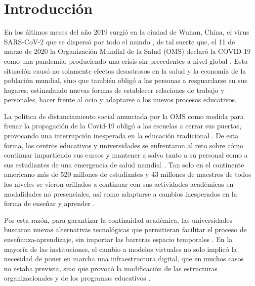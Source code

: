 \documentclass[spanish]{textolivre}
\begin{document}
\begin{polyabstract}
\begin{english}
\begin{abstract}

\end{abstract}
\end{english}

\end{polyabstract}

\section{Introducción}

En los últimos meses del año 2019 surgió en la ciudad de Wuhan, China, el virus SARS-CoV-2 que se dispersó por todo el mundo \cite{sorooshian_quarantine_2020}, de tal suerte que, el 11 de marzo de 2020 la Organización Mundial de la Salud (OMS) declaró la COVID-19 como una pandemia, produciendo una crisis sin precedentes a nivel global \cite{world_health_organization_coronavirus_2020}. Esta situación causó no solamente efectos desastrosos en la salud y la economía de la población mundial, sino que también obligó a las personas a resguardarse en sus hogares, estimulando nuevas formas de establecer relaciones de trabajo y personales, hacer frente al ocio y adaptarse a los nuevos procesos educativos.

La política de distanciamiento social anunciada por la OMS como medida para frenar la propagación de la Covid-19 obligó a las escuelas a cerrar sus puertas, provocando una interrupción inesperada en la educación tradicional \cite{adedoyin_covid-19_2020}. De esta forma, los centros educativos y universidades se enfrentaron al reto sobre cómo continuar impartiendo sus cursos y mantener a salvo tanto a su personal como a sus estudiantes de una emergencia de salud mundial \cite{tunon_navarro_confinamiento_2020}. Tan solo en el continente americano más de 520 millones de estudiantes y 43 millones de maestros de todos los niveles se vieron orillados a continuar con sus actividades académicas en modalidades no presenciales, así como adaptarse a cambios inesperados en la forma de enseñar y aprender \cite{iesalc-unesco_coronavirus_2020}.

Por esta razón, para garantizar la continuidad académica, las universidades buscaron nuevas alternativas tecnológicas que permitieran facilitar el proceso de enseñanza-aprendizaje, sin importar las barreras espacio temporales \cite{salas-rueda_percepcion_2022}. En la mayoría de las instituciones, el cambio a modelos virtuales no solo implicó la necesidad de poner en marcha una infraestructura digital, que en muchos casos no estaba prevista, sino que provocó la modificación de las estructuras organizacionales y de los programas educativos \cite{garcia-de-paz_transicion_2020}.
\end{document}

